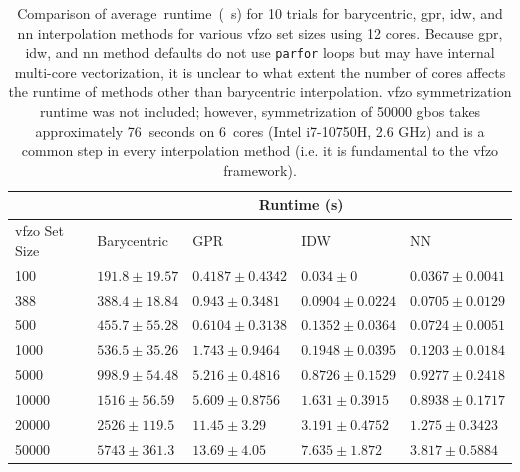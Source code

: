 \documentclass[final,twocolumn,12pt]{elsarticle}
\newcommand{\symtime}{76}
\begin{document}
{\begin{table}
\centering
\caption{Comparison of average~runtime~(\SI{}{\second}) for \num{10} trials for barycentric, \gls{gpr}, \gls{idw}, and \gls{nn} interpolation methods for various \gls{vfzo} set sizes using 12 cores. Because \gls{gpr}, \gls{idw}, and \gls{nn} method defaults do not use \texttt{parfor} loops but may have internal multi-core vectorization, it is unclear to what extent the number of cores affects the runtime of methods other than barycentric interpolation. \Gls{vfzo} symmetrization runtime was not included; however, symmetrization of \num{50000} \glspl{gbo} takes approximately \SI{\symtime}{seconds} on \SI{6}{cores} (Intel i7-10750H, 2.6 GHz) and is a common step in every interpolation method (i.e. it is fundamental to the \gls{vfzo} framework).}
\label{tab:runtime}
\begin{tabular}{lllll}
\cline{2-5}
                    & \multicolumn{4}{c}{Runtime (s)}                                                     \\ \hline
\gls{vfzo} Set Size & Barycentric       & GPR                 & IDW                 & NN                  \\ \hline
\num{100}           & $191.8 \pm 19.57$ & $0.4187 \pm 0.4342$ & $0.034 \pm 0$       & $0.0367 \pm 0.0041$ \\
\num{388}           & $388.4 \pm 18.84$ & $0.943 \pm 0.3481$  & $0.0904 \pm 0.0224$ & $0.0705 \pm 0.0129$ \\
\num{500}           & $455.7 \pm 55.28$ & $0.6104 \pm 0.3138$ & $0.1352 \pm 0.0364$ & $0.0724 \pm 0.0051$ \\
\num{1000}          & $536.5 \pm 35.26$ & $1.743 \pm 0.9464$  & $0.1948 \pm 0.0395$ & $0.1203 \pm 0.0184$ \\
\num{5000}          & $998.9 \pm 54.48$ & $5.216 \pm 0.4816$  & $0.8726 \pm 0.1529$ & $0.9277 \pm 0.2418$ \\
\num{10000}         & $1516 \pm 56.59$  & $5.609 \pm 0.8756$  & $1.631 \pm 0.3915$  & $0.8938 \pm 0.1717$ \\
\num{20000}         & $2526 \pm 119.5$  & $11.45 \pm 3.29$    & $3.191 \pm 0.4752$  & $1.275 \pm 0.3423$  \\
\num{50000}         & $5743 \pm 361.3$  & $13.69 \pm 4.05$    & $7.635 \pm 1.872$   & $3.817 \pm 0.5884$  \\ \hline
\end{tabular}
\end{table}

}
\end{document}
